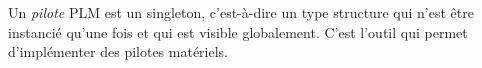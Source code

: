





Un \emph{pilote} PLM est un singleton, c'est-à-dire un type structure qui n'est être instancié qu'une fois et qui est visible globalement. C'est l'outil qui permet d'implémenter des pilotes matériels.





